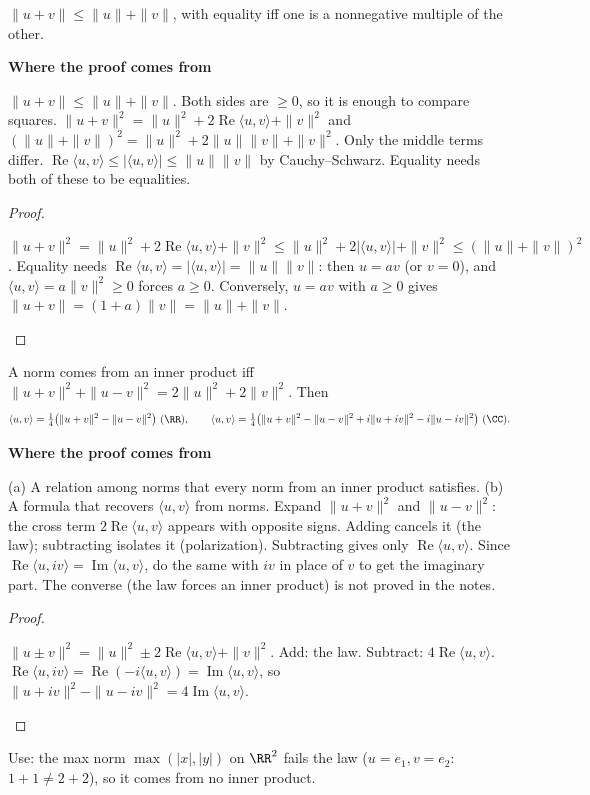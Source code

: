 \documentclass[10pt]{scrartcl}
\newcommand{\ip}[2]{\langle #1,#2\rangle}
\newenvironment{motive}{\begin{mdframed}[style=thinkbox]\textbf{\color{OliveGreen!75!black}Where the proof comes from}\begin{description}[leftmargin=0.9em,labelindent=0pt,itemsep=2pt,topsep=2pt,font=\normalfont\bfseries\color{OliveGreen!70!black}]}{\end{description}\end{mdframed}}
\newenvironment{steps}{\begin{enumerate}[label=\arabic*.,leftmargin=1.5em,itemsep=2pt,topsep=2pt]}{\end{enumerate}}
\begin{document}
\begin{proposition*}
  $\|u+v\|\le\|u\|+\|v\|$, with equality iff one is a nonnegative multiple of the other.
\end{proposition*}
\begin{motive}
  \ii[Want.] $\|u+v\|\le\|u\|+\|v\|$. Both sides are $\ge0$, so it is enough to compare squares.
  \ii[Know.] $\|u+v\|^2=\|u\|^2+2\operatorname{Re}\ip uv+\|v\|^2$ and $(\|u\|+\|v\|)^2=\|u\|^2+2\|u\|\|v\|+\|v\|^2$. Only the middle terms differ.
   $\operatorname{Re}\ip uv\le|\ip uv|\le\|u\|\|v\|$ by Cauchy--Schwarz. Equality needs both of these to be equalities.
\end{motive}
\begin{proof}
  \begin{steps}
    \ii $\|u+v\|^2=\|u\|^2+2\operatorname{Re}\ip uv+\|v\|^2\le\|u\|^2+2|\ip uv|+\|v\|^2\le(\|u\|+\|v\|)^2$.
    \ii Equality needs $\operatorname{Re}\ip uv=|\ip uv|=\|u\|\|v\|$: then $u=av$ (or $v=0$), and $\ip uv=a\|v\|^2\ge0$ forces $a\ge0$.
    \ii Conversely, $u=av$ with $a\ge0$ gives $\|u+v\|=(1+a)\|v\|=\|u\|+\|v\|$.
  \end{steps}
\end{proof}

\begin{proposition*}
  A norm comes from an inner product iff $\|u+v\|^2+\|u-v\|^2=2\|u\|^2+2\|v\|^2$. Then
  \[ \ip uv=\tfrac14\big(\|u+v\|^2-\|u-v\|^2\big)\ (\RR),\qquad\ip uv=\tfrac14\big(\|u+v\|^2-\|u-v\|^2+i\|u+iv\|^2-i\|u-iv\|^2\big)\ (\CC). \]
\end{proposition*}
\begin{motive}
  \ii[Want.] (a) A relation among norms that every norm from an inner product satisfies. (b) A formula that recovers $\ip uv$ from norms.
   Expand $\|u+v\|^2$ and $\|u-v\|^2$: the cross term $2\operatorname{Re}\ip uv$ appears with opposite signs. Adding cancels it (the law); subtracting isolates it (polarization).
  \ii[Over $\CC$.] Subtracting gives only $\operatorname{Re}\ip uv$. Since $\operatorname{Re}\ip u{iv}=\operatorname{Im}\ip uv$, do the same with $iv$ in place of $v$ to get the imaginary part.
  \ii[Note.] The converse (the law forces an inner product) is not proved in the notes.
\end{motive}
\begin{proof}
  \begin{steps}
    \ii $\|u\pm v\|^2=\|u\|^2\pm2\operatorname{Re}\ip uv+\|v\|^2$. Add: the law. Subtract: $4\operatorname{Re}\ip uv$.
    \ii $\operatorname{Re}\ip u{iv}=\operatorname{Re}(-i\ip uv)=\operatorname{Im}\ip uv$, so $\|u+iv\|^2-\|u-iv\|^2=4\operatorname{Im}\ip uv$.
  \end{steps}
\end{proof}
Use: the max norm $\max(|x|,|y|)$ on $\RR^2$ fails the law ($u=e_1,v=e_2$: $1+1\ne2+2$), so it comes from no inner product.
\end{document}
